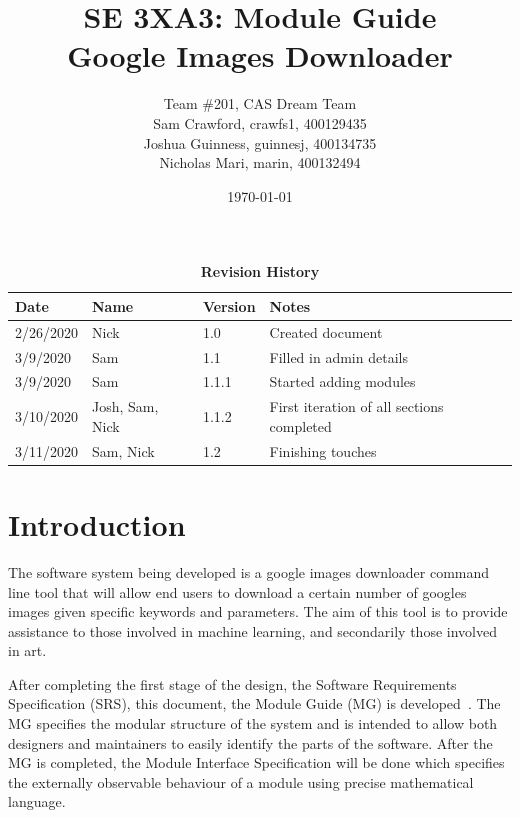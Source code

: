 \documentclass[12pt, titlepage]{article}
\title{SE 3XA3: Module Guide\\Google Images Downloader}
\author{Team \#201, CAS Dream Team
		\\ Sam Crawford, crawfs1, 400129435
		\\ Joshua Guinness, guinnesj, 400134735
		\\ Nicholas Mari, marin, 400132494
}
\date{\today}
\begin{document}
\maketitle

\tableofcontents
\listoftables
\listoffigures

\begin{table}[tp]
\begin{tabularx}{\textwidth}{lllp{7.5cm}}
\toprule {\bf Date} & {\bf Name} & {\bf Version} & {\bf Notes}\\
\midrule
2/26/2020 & Nick & 1.0 & Created document\\
3/9/2020 & Sam & 1.1 & Filled in admin details\\
3/9/2020 & Sam & 1.1.1 & Started adding modules\\
3/10/2020 & Josh, Sam, Nick & 1.1.2 & First iteration of all sections completed\\
3/11/2020 & Sam, Nick & 1.2 & Finishing touches\\
\bottomrule
\end{tabularx}
\caption{\bf Revision History}
\end{table}


\newpage


\section{Introduction}

The software system being developed is a google images downloader command line tool that
will allow end users to download a certain number of googles images given
specific keywords and parameters. The aim of this tool is to provide assistance to those
involved in machine learning, and secondarily those involved in art.

After completing the first stage of the design, the Software Requirements Specification (SRS), this document, the Module Guide (MG) is developed~\citep{ParnasEtAl1984}. The MG
specifies the modular structure of the system and is intended to allow both
designers and maintainers to easily identify the parts of the software. After the MG is completed, the Module Interface Specification will be done which specifies the externally observable behaviour of a module using precise mathematical language.
\end{document}
